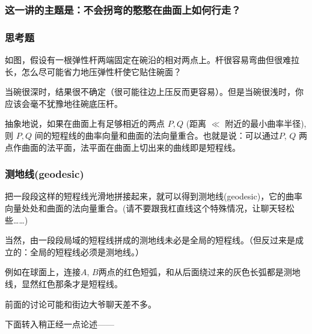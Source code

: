 \documentclass[CJK,13pt]{beamer}
\date{}
\begin{document}
  \bch
{}


\begin{frame}
  
  \frametitle{这一讲的主题是：不会拐弯的憨憨在曲面上如何行走？}

  
\end{frame}



\begin{frame}
  \frametitle{思考题}


  如图，假设有一根弹性杆两端固定在碗沿的相对两点上。杆很容易弯曲但很难拉长，怎么尽可能省力地压弹性杆使它贴住碗面？

\end{frame}


\begin{frame}
  
  当碗很深时，结果很不确定（很可能往边上压反而更容易）。但是当碗很浅时，你应该会毫不犹豫地往碗底压杆。


  抽象地说，如果在曲面上有足够相近的两点 $P,Q$ (距离 $\ll $ 附近的最小曲率半径), 则 $P, Q$ 间的{\blue 短程线的曲率向量和曲面的法向量重合}。也就是说：可以通过$P$, $Q$ 两点作曲面的法平面，法平面在曲面上切出来的曲线即是短程线。

  
\end{frame}


\begin{frame}
  \frametitle{测地线(geodesic)}
  把一段段这样的短程线光滑地拼接起来，就可以得到{\blue 测地线(geodesic)}，它的曲率向量处处和曲面的法向量重合。{\scriptsize(请不要跟我杠直线这个特殊情况，让聊天轻松些……)}
  
  当然，由一段段局域的短程线拼成的测地线未必是全局的短程线。{\scriptsize（但反过来是成立的：全局的短程线必须是测地线。）}


  例如在球面上，连接$A$, $B$两点的红色短弧，和从后面绕过来的灰色长弧都是测地线，显然红色那条才是短程线。
\end{frame}


\begin{frame}

  前面的讨论可能和街边大爷聊天差不多。


  下面转入稍正经一点论述——
\end{frame}
\end{document}
